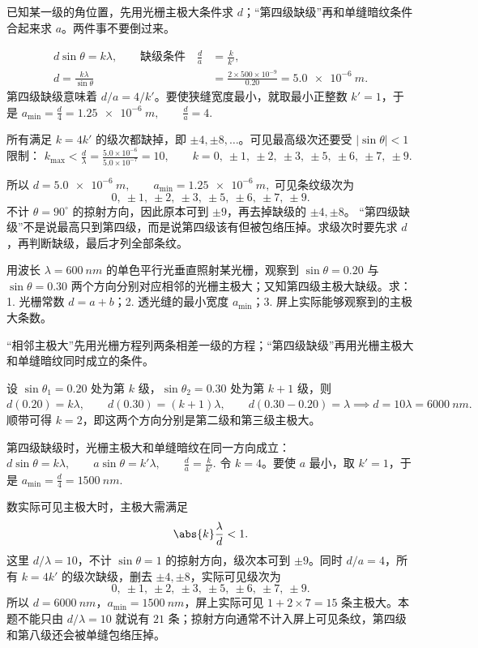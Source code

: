\documentclass[lang=cn,11pt]{elegantbook}
\begin{document}
\begin{solution}
已知某一级的角位置，先用光栅主极大条件求 \(d\)；“第四级缺级”再和单缝暗纹条件合起来求 \(a\)。两件事不要倒过来。

\[
\begin{aligned}
d\sin\theta=k\lambda,\qquad
\text{缺级条件}\quad \frac{d}{a}&=\frac{k}{k'},\\
d=\frac{k\lambda}{\sin\theta}
&=\frac{2\times 500\times10^{-9}}{0.20}
=\SI{5.0e-6}{m}.
\end{aligned}
\]
第四级缺级意味着 \(d/a=4/k'\)。要使狭缝宽度最小，就取最小正整数 \(k'=1\)，于是
 \(a_{\min}=\frac{d}{4}=\SI{1.25e-6}{m},\qquad \frac{d}{a}=4.\) 

所有满足 \(k=4k'\) 的级次都缺掉，即 \(\pm4,\pm8,\dots\)。可见最高级次还要受 \(|\sin\theta|<1\) 限制：
 \(k_{\max}<\frac{d}{\lambda} =\frac{5.0\times10^{-6}}{5.0\times10^{-7}}=10, \qquad k=0,\ \pm1,\ \pm2,\ \pm3,\ \pm5,\ \pm6,\ \pm7,\ \pm9.\) 

所以
 \(d=\SI{5.0e-6}{m},\qquad a_{\min}=\SI{1.25e-6}{m},\) 
可见条纹级次为
\[
0,\ \pm1,\ \pm2,\ \pm3,\ \pm5,\ \pm6,\ \pm7,\ \pm9.
\]
不计 \(\theta=90^\circ\) 的掠射方向，因此原本可到 \(\pm9\)，再去掉缺级的 \(\pm4,\pm8\)。
“第四级缺级”不是说最高只到第四级，而是说第四级该有但被包络压掉。求级次时要先求 \(d\)，再判断缺级，最后才列全部条纹。
\end{solution}

\begin{exercise}
用波长 \(\lambda=\SI{600}{nm}\) 的单色平行光垂直照射某光栅，观察到 \(\sin\theta=0.20\) 与 \(\sin\theta=0.30\) 两个方向分别对应相邻的光栅主极大；又知第四级主极大缺级。求：1. 光栅常数 \(d=a+b\)；2. 透光缝的最小宽度 \(a_{\min}\)；3. 屏上实际能够观察到的主极大条数。
\end{exercise}

\begin{solution}
“相邻主极大”先用光栅方程列两条相差一级的方程；“第四级缺级”再用光栅主极大和单缝暗纹同时成立的条件。

设 \(\sin\theta_1=0.20\) 处为第 \(k\) 级，\(\sin\theta_2=0.30\) 处为第 \(k+1\) 级，则
 \(d(0.20)=k\lambda,\qquad d(0.30)=(k+1)\lambda,\qquad d(0.30-0.20)=\lambda \implies d=10\lambda=\SI{6000}{nm}.\) 
顺带可得 \(k=2\)，即这两个方向分别是第二级和第三级主极大。

第四级缺级时，光栅主极大和单缝暗纹在同一方向成立：
 \(d\sin\theta=k\lambda,\qquad a\sin\theta=k'\lambda,\qquad \frac{d}{a}=\frac{k}{k'}.\) 
令 \(k=4\)。要使 \(a\) 最小，取 \(k'=1\)，于是
 \(a_{\min}=\frac{d}{4}=\SI{1500}{nm}.\) 

数实际可见主极大时，主极大需满足
\[
\abs{k}\frac{\lambda}{d}<1.
\]
这里 \(d/\lambda=10\)，不计 \(\sin\theta=1\) 的掠射方向，级次本可到 \(\pm9\)。同时 \(d/a=4\)，所有 \(k=4k'\) 的级次缺级，删去 \(\pm4,\pm8\)，实际可见级次为
\[
0,\ \pm1,\ \pm2,\ \pm3,\ \pm5,\ \pm6,\ \pm7,\ \pm9.
\]
所以 \(d=\SI{6000}{nm}\)，\(a_{\min}=\SI{1500}{nm}\)，屏上实际可见 \(1+2\times7=15\) 条主极大。本题不能只由 \(d/\lambda=10\) 就说有 \(21\) 条；掠射方向通常不计入屏上可见条纹，第四级和第八级还会被单缝包络压掉。
\end{solution}
\end{document}
